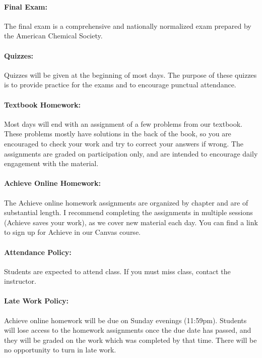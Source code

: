 \documentclass[12pt, letterpaper]{article}
\begin{document}
\paragraph{Final Exam:}
The final exam is a comprehensive and nationally normalized exam prepared by the American Chemical Society.

\paragraph{Quizzes:}
Quizzes will be given at the beginning of most days. The purpose of these quizzes is to provide practice for the exams and to encourage punctual attendance.

\paragraph{Textbook Homework:}
Most days will end with an assignment of a few problems from our textbook. These problems mostly have solutions in the back of the book, so you are encouraged to check your work and try to correct your answers if wrong. The assignments are graded on participation only, and are intended to encourage daily engagement with the material.

\paragraph{Achieve Online Homework:}
The Achieve online homework assignments are organized by chapter and are of substantial length. I recommend completing the assignments in multiple sessions (Achieve saves your work), as we cover new material each day. You can find a link to sign up for Achieve in our Canvas course.

\paragraph{Attendance Policy:}
Students are expected to attend class. If you must miss class, contact the instructor.

\paragraph{Late Work Policy:}
Achieve online homework will be due on Sunday evenings (11:59pm). Students will lose access to the homework assignments once the due date has passed, and they will be graded on the work which was completed by that time. There will be no opportunity to turn in late work.
\end{document}
